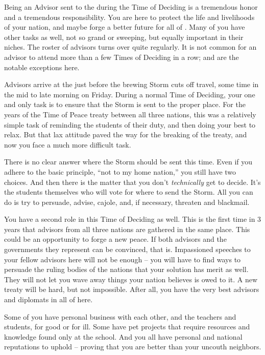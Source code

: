 \documentclass[blue]{GL2020}
\begin{document}
\name{\bAdvisorBlue{}}

Being an Advisor sent to the \pSchool{} during the Time of Deciding is a tremendous honor and a tremendous responsibility. You are here to protect the life and livelihoods of your nation, and maybe forge a better future for all of \pEarth{}. Many of you have other tasks as well, not so grand or sweeping, but equally important in their niches. The roster of advisors turns over quite regularly. It is not common for an advisor to attend more than a few Times of Deciding in a row; \cDiplomat{\full} and \cHeadDiplomat{\full} are the notable exceptions here.

Advisors arrive at the \pSc{} just before the brewing Storm cuts off travel, some time in the mid to late morning on Friday. During a normal Time of Deciding, your one and only task is to ensure that the Storm is sent to the proper place. For the years of the Time of Peace treaty between all three nations, this was a relatively simple task of reminding the students of their duty, and then doing your best to relax. But that lax attitude paved the way for the breaking of the treaty, and now you face a much more difficult task.

There is no clear answer where the Storm should be sent this time. Even if you adhere to the basic principle, ``not to my home nation,'' you still have two choices. And then there is the matter that you don't \emph{technically} get to decide. It's the students themselves who will vote for where to send the Storm. All you can do is try to persuade, advise, cajole, and, if necessary, threaten and blackmail.

You have a second role in this Time of Deciding as well. This is the first time in 3 years that advisors from all three nations are gathered in the same place. This could be an opportunity to forge a new peace. If both advisors and the governments they represent can be convinced, that is. Impassioned speeches to your fellow advisors here will not be enough -- you will have to find ways to persuade the ruling bodies of the nations that your solution has merit as well. They will not let you wave away things your nation believes is owed to it. A new treaty will be hard, but not impossible. After all, you have the very best advisors and diplomats in all of \pEarth{} here.

Some of you have personal business with each other, and the teachers and students, for good or for ill. Some have pet projects that require resources and knowledge found only at the school. And you all have personal and national reputations to uphold -- proving that you are better than your uncouth neighbors.
\end{document}
